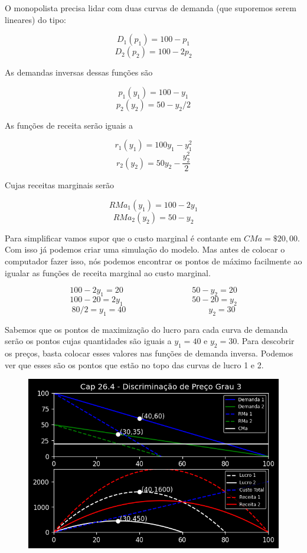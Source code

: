 \documentclass[a4paper,11pt,oneside]{book}
\theoremstyle{definition}
\theoremstyle{break}
\begin{document}
O monopolista precisa lidar com duas curvas de demanda (que suporemos serem lineares) do tipo:

$$ D_1(p_1) = 100 - p_1 $$
$$ D_2(p_2) = 100 - 2p_2 $$

As demandas inversas dessas funções são

$$ p_1(y_1) = 100 - y_1 $$
$$ p_2(y_2) = 50 - y_2/2 $$

As funções de receita serão iguais a

$$ r_1(y_1) = 100y_1 - y_{1}^{2} $$
$$ r_2(y_2) = 50y_2 - \frac{y_{2}^{2}}{2} $$

Cujas receitas marginais serão

$$ RMa_1(y_1) = 100 - 2y_{1} $$
$$ RMa_2(y_2) = 50 - y_{2} $$

Para simplificar vamos supor que o custo marginal é contante em $CMa = \$ 20,00 $. Com isso já podemos criar uma simulação do modelo. Mas antes de colocar o computador fazer isso, nós podemos encontrar os pontos de máximo facilmente ao igualar as funções de receita marginal ao custo marginal.

$$ 100 - 2y_{1} = 20 \hspace{100pt} 50 - y_{2} = 20 $$
$$ 100 - 20 = 2y_{1} \hspace{100pt} 50 - 20 = y_{2} $$
$$ 80/2 = y_{1} = 40 \hspace{120pt} y_2 = 30 $$

Sabemos que os pontos de maximização do lucro para cada curva de demanda serão os pontos cujas quantidades são iguais a $y_1 = 40$ e $y_2 = 30$. Para descobrir os preços, basta colocar esses valores nas funções de demanda inversa. Podemos ver que esses são os pontos que estão no topo das curvas de lucro 1 e 2.

\begin{figure}[H]
\centering
\includegraphics[scale=0.8]{cap26_4-discriminacao_grau3.png}
\end{figure}
\end{document}
